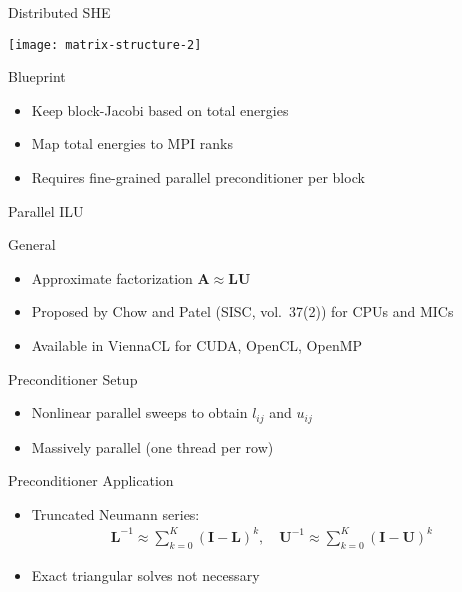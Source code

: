 

\begin{frame}{Distributed SHE}

  \begin{center}
    \texttt{[image: matrix-structure-2]}
  \end{center}

  
  \begin{block}{Blueprint}
   \begin{itemize}
    \item Keep block-Jacobi based on total energies
    \item Map total energies to MPI ranks
    \item Requires fine-grained parallel preconditioner per block
   \end{itemize}
  \end{block}
  
\end{frame}


\begin{frame}{Parallel ILU}

  \begin{block}{General}
   \begin{itemize}
    \item Approximate factorization $\mathbf{A} \approx \mathbf{L} \mathbf{U}$
    \item Proposed by Chow and Patel (SISC, vol.~37(2)) for CPUs and MICs
    \item Available in ViennaCL for CUDA, OpenCL, OpenMP
   \end{itemize}
  \end{block}
  

  \begin{block}{Preconditioner Setup}
   \begin{itemize}
    \item Nonlinear parallel sweeps to obtain $l_{ij}$ and $u_{ij}$
    \item Massively parallel (one thread per row)
   \end{itemize}
  \end{block}

  
  \begin{block}{Preconditioner Application}
   \begin{itemize}
    \item Truncated Neumann series:
     \begin{align*} \mathbf{L}^{-1} \approx \sum_{k=0}^K (\mathbf{I} - \mathbf{L})^k, \quad \mathbf{U}^{-1} \approx \sum_{k=0}^K (\mathbf{I} - \mathbf{U})^k \end{align*}
    \item Exact triangular solves not necessary
   \end{itemize}
  \end{block}

\end{frame}


